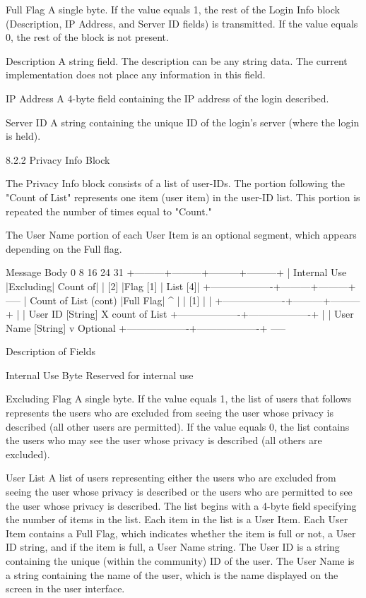 \documentclass[titlepage,oneside]{book}
\begin{document}
Full Flag
  A single byte. If the value equals 1, the rest of the Login Info
  block (Description, IP Address, and Server ID fields) is
  transmitted. If the value equals 0, the rest of the block is not
  present.

Description
  A string field. The description can be any string data. The current
  implementation does not place any information in this field.

IP Address
  A 4-byte field containing the IP address of the login described.

Server ID
  A string containing the unique ID of the login's server
  (where the login is held).


8.2.2 Privacy Info Block

The Privacy Info block consists of a list of user-IDs. The portion
following the "Count of List" represents one item (user item) in the
user-ID list. This portion is repeated the number of times equal to
"Count."

The User Name portion of each User Item is an optional segment, which
appears depending on the Full flag.

Message Body
0         8         16        24      31
+---------+---------+---------+---------+
|    Internal Use   |Excluding| Count of|
|        [2]        |Flag [1] | List [4]|
+-------------------+---------+---------+   -----
| Count of List (cont)        |Full Flag|     ^
|                             |   [1]   |     |
+-------------------+---------+---------+     |
| User ID [String]                           X count of List
+-------------------+-------------------+     |
| User Name [String]                          v   Optional
+-------------------+-------------------+   -----

Description of Fields

Internal Use Byte
  Reserved for internal use

Excluding Flag
  A single byte. If the value equals 1, the list of users that follows
  represents the users who are excluded from seeing the user whose
  privacy is described (all other users are permitted).
  If the value equals 0, the list contains the users who may see the
  user whose privacy is described (all others are excluded).

User List
  A list of users representing either the users who are excluded from
  seeing the user whose privacy is described or the users who are
  permitted to see the user whose privacy is described. The list
  begins with a 4-byte field specifying the number of items in the
  list. Each item in the list is a User Item. Each User Item contains
  a Full Flag, which indicates whether the item is full or not, a User
  ID string, and if the item is full, a User Name string.
  The User ID is a string containing the unique (within the community)
  ID of the user. The User Name is a string containing the name of the
  user, which is the name displayed on the screen in the user
  interface.
\end{document}
